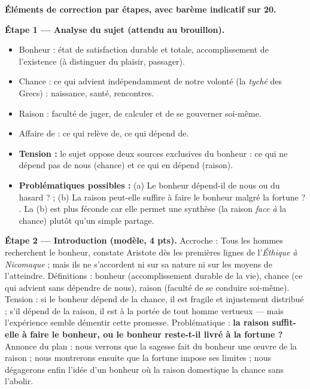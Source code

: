 \documentclass[11pt]{article}
\newcommand{\cle}[1]{{\popxbold\color{popdark}#1}}
\begin{document}
\begin{corrige}
\textbf{Éléments de correction par étapes, avec barème indicatif sur 20.}

\textbf{Étape 1 — Analyse du sujet (attendu au brouillon).}
\begin{itemize}
\item \cle{Bonheur} : état de satisfaction durable et totale, accomplissement de l'existence (à distinguer du plaisir, passager).
\item \cle{Chance} : ce qui advient indépendamment de notre volonté (la \emph{tyché} des Grecs) : naissance, santé, rencontres.
\item \cle{Raison} : faculté de juger, de calculer et de se gouverner soi-même.
\item \og Affaire de \fg{} : ce qui relève de, ce qui dépend de.
\item \textbf{Tension :} le sujet oppose deux sources exclusives du bonheur : ce qui ne dépend pas de nous (chance) et ce qui en dépend (raison).
\item \textbf{Problématiques possibles :} (a) \og Le bonheur dépend-il de nous ou du hasard ? \fg{} ; (b) \og La raison peut-elle suffire à faire le bonheur malgré la fortune ? \fg{}. La (b) est plus féconde car elle permet une synthèse (la raison \emph{face à} la chance) plutôt qu'un simple partage.
\end{itemize}

\textbf{Étape 2 — Introduction (modèle, 4 pts).} Accroche : \og Tous les hommes recherchent le bonheur, constate Aristote dès les premières lignes de l'\emph{Éthique à Nicomaque} ; mais ils ne s'accordent ni sur sa nature ni sur les moyens de l'atteindre. \fg{} Définitions : bonheur (accomplissement durable de la vie), chance (ce qui advient sans dépendre de nous), raison (faculté de se conduire soi-même). Tension : si le bonheur dépend de la chance, il est fragile et injustement distribué ; s'il dépend de la raison, il est à la portée de tout homme vertueux — mais l'expérience semble démentir cette promesse. Problématique : \textbf{la raison suffit-elle à faire le bonheur, ou le bonheur reste-t-il livré à la fortune ?} Annonce du plan : nous verrons que la sagesse fait du bonheur une œuvre de la raison ; nous montrerons ensuite que la fortune impose ses limites ; nous dégagerons enfin l'idée d'un bonheur où la raison domestique la chance sans l'abolir.


\end{corrige}
\end{document}
